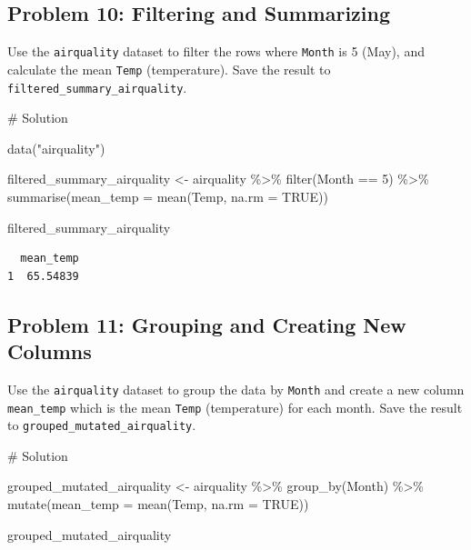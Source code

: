 \documentclass[
  letterpaper,
  DIV=11,
  numbers=noendperiod]{scrreprt}
\newenvironment{Shaded}{\begin{snugshade}}{\end{snugshade}}
\newcommand{\AttributeTok}[1]{\textcolor[rgb]{0.40,0.45,0.13}{#1}}
\newcommand{\CommentTok}[1]{\textcolor[rgb]{0.37,0.37,0.37}{#1}}
\newcommand{\ConstantTok}[1]{\textcolor[rgb]{0.56,0.35,0.01}{#1}}
\newcommand{\DecValTok}[1]{\textcolor[rgb]{0.68,0.00,0.00}{#1}}
\newcommand{\FunctionTok}[1]{\textcolor[rgb]{0.28,0.35,0.67}{#1}}
\newcommand{\NormalTok}[1]{\textcolor[rgb]{0.00,0.23,0.31}{#1}}
\newcommand{\OtherTok}[1]{\textcolor[rgb]{0.00,0.23,0.31}{#1}}
\newcommand{\SpecialCharTok}[1]{\textcolor[rgb]{0.37,0.37,0.37}{#1}}
\newcommand{\StringTok}[1]{\textcolor[rgb]{0.13,0.47,0.30}{#1}}
\begin{document}
\subsection*{Problem 10: Filtering and
Summarizing}\label{problem-10-filtering-and-summarizing}

Use the \texttt{airquality} dataset to filter the rows where
\texttt{Month} is 5 (May), and calculate the mean \texttt{Temp}
(temperature). Save the result to
\texttt{filtered\_summary\_airquality}.

\begin{Shaded}
\begin{Highlighting}[]
\CommentTok{\# Solution}

\FunctionTok{data}\NormalTok{(}\StringTok{"airquality"}\NormalTok{)}

\NormalTok{filtered\_summary\_airquality }\OtherTok{\textless{}{-}}\NormalTok{ airquality }\SpecialCharTok{\%\textgreater{}\%}
  \FunctionTok{filter}\NormalTok{(Month }\SpecialCharTok{==} \DecValTok{5}\NormalTok{) }\SpecialCharTok{\%\textgreater{}\%}
  \FunctionTok{summarise}\NormalTok{(}\AttributeTok{mean\_temp =} \FunctionTok{mean}\NormalTok{(Temp, }\AttributeTok{na.rm =} \ConstantTok{TRUE}\NormalTok{))}

\NormalTok{filtered\_summary\_airquality}
\end{Highlighting}
\end{Shaded}

\begin{verbatim}
  mean_temp
1  65.54839
\end{verbatim}

\subsection*{Problem 11: Grouping and Creating New
Columns}\label{problem-11-grouping-and-creating-new-columns}

Use the \texttt{airquality} dataset to group the data by \texttt{Month}
and create a new column \texttt{mean\_temp} which is the mean
\texttt{Temp} (temperature) for each month. Save the result to
\texttt{grouped\_mutated\_airquality}.

\begin{Shaded}
\begin{Highlighting}[]
\CommentTok{\# Solution}

\NormalTok{grouped\_mutated\_airquality }\OtherTok{\textless{}{-}}\NormalTok{ airquality }\SpecialCharTok{\%\textgreater{}\%}
  \FunctionTok{group\_by}\NormalTok{(Month) }\SpecialCharTok{\%\textgreater{}\%}
  \FunctionTok{mutate}\NormalTok{(}\AttributeTok{mean\_temp =} \FunctionTok{mean}\NormalTok{(Temp, }\AttributeTok{na.rm =} \ConstantTok{TRUE}\NormalTok{))}

\NormalTok{grouped\_mutated\_airquality}
\end{Highlighting}
\end{Shaded}
\end{document}

